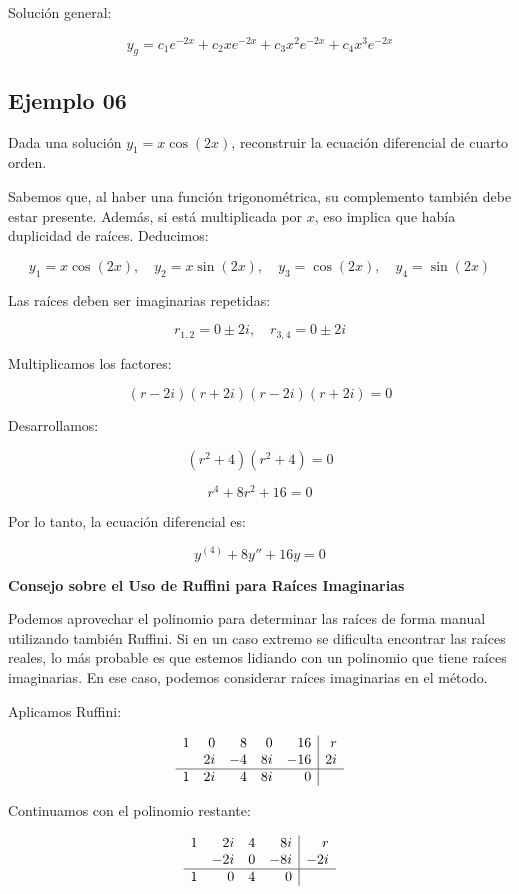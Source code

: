 Solución general:

\[
y_{g} = c_{1} e^{-2x} + c_{2} x e^{-2x} + c_{3} x^2 e^{-2x} + c_{4} x^3 e^{-2x}
\]

\subsection{Ejemplo 06}

Dada una solución \( y_1 = x\cos(2x) \), reconstruir la ecuación diferencial de cuarto orden.

Sabemos que, al haber una función trigonométrica, su complemento también debe estar presente. Además, si está multiplicada por \( x \), eso implica que había duplicidad de raíces. Deducimos:

\[
y_1 = x\cos(2x), \quad y_2 = x\sin(2x), \quad y_3 = \cos(2x), \quad y_4 = \sin(2x)
\]

Las raíces deben ser imaginarias repetidas:

\[
r_{1,2} = 0 \pm 2i, \quad r_{3,4} = 0 \pm 2i
\]

Multiplicamos los factores:

\[
(r - 2i)(r + 2i)(r - 2i)(r + 2i) = 0
\]

Desarrollamos:

\[
(r^2 + 4)(r^2 + 4) = 0
\]

\[
r^4 + 8r^2 + 16 = 0
\]

Por lo tanto, la ecuación diferencial es:

\[
y^{(4)} + 8y'' + 16y = 0
\]

\textbf{Consejo sobre el Uso de Ruffini para Raíces Imaginarias}

Podemos aprovechar el polinomio para determinar las raíces de forma manual utilizando también Ruffini.  
Si en un caso extremo se dificulta encontrar las raíces reales, lo más probable es que estemos lidiando con un polinomio que tiene raíces imaginarias.  
En ese caso, podemos considerar raíces imaginarias en el método.

Aplicamos Ruffini:

\[
\begin{array}{ r r r r r|r }
1 & 0 & 8 & 0 & 16 & r\\
 & 2i & -4 & 8i & -16 & 2i\\
\hline
1 & 2i & 4 & 8i & 0 &  
\end{array}
\]

Continuamos con el polinomio restante:

\[
\begin{array}{ r r r r|r }
1 & 2i & 4 & 8i & r\\
 & -2i & 0 & -8i & -2i\\
\hline
1 & 0 & 4 & 0 &  
\end{array}
\]

